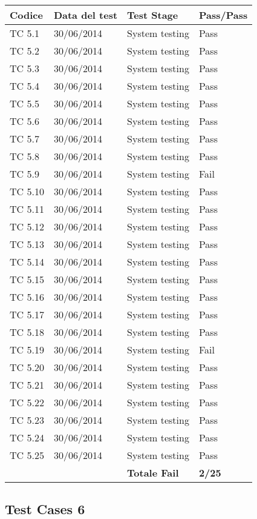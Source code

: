 \begin{tabular}{|p{3cm}|p{3cm}|p{3cm}|p{3cm}|}
	\hline
	\rowcolor{Gray}
	\textbf{Codice} & \textbf{Data del test} & \textbf{Test Stage} & \textbf{Pass/Pass}\tabularnewline
	\hline
	TC 5.1			& 30/06/2014 			& System testing		& Pass \tabularnewline
	\hline
	TC 5.2			& 30/06/2014 			& System testing		& Pass \tabularnewline
	\hline
	TC 5.3			& 30/06/2014 			& System testing		& Pass \tabularnewline
	\hline
	TC 5.4			& 30/06/2014 			& System testing		& Pass \tabularnewline
	\hline
	TC 5.5			& 30/06/2014 			& System testing		& Pass \tabularnewline
	\hline
	TC 5.6			& 30/06/2014 			& System testing		& Pass \tabularnewline
	\hline
	TC 5.7			& 30/06/2014 			& System testing		& Pass \tabularnewline
	\hline
	TC 5.8			& 30/06/2014 			& System testing		& Pass \tabularnewline
	\hline
	TC 5.9			& 30/06/2014 			& System testing		& Fail \tabularnewline
	\hline
	TC 5.10			& 30/06/2014 			& System testing		& Pass \tabularnewline
	\hline
	TC 5.11			& 30/06/2014 			& System testing		& Pass \tabularnewline
	\hline
	TC 5.12			& 30/06/2014 			& System testing		& Pass \tabularnewline
	\hline
	TC 5.13			& 30/06/2014 			& System testing		& Pass \tabularnewline
	\hline
	TC 5.14			& 30/06/2014 			& System testing		& Pass \tabularnewline
	\hline
	TC 5.15			& 30/06/2014 			& System testing		& Pass \tabularnewline
	\hline
	TC 5.16			& 30/06/2014 			& System testing		& Pass \tabularnewline
	\hline
	TC 5.17			& 30/06/2014 			& System testing		& Pass \tabularnewline
	\hline
	TC 5.18			& 30/06/2014 			& System testing		& Pass \tabularnewline
	\hline
	TC 5.19			& 30/06/2014 			& System testing		& Fail \tabularnewline
	\hline
	TC 5.20			& 30/06/2014 			& System testing		& Pass \tabularnewline
	\hline
	TC 5.21			& 30/06/2014 			& System testing		& Pass \tabularnewline
	\hline
	TC 5.22			& 30/06/2014 			& System testing		& Pass \tabularnewline
	\hline
	TC 5.23			& 30/06/2014 			& System testing		& Pass \tabularnewline
	\hline
	TC 5.24			& 30/06/2014 			& System testing		& Pass \tabularnewline
	\hline
	TC 5.25			& 30/06/2014 			& System testing		& Pass \tabularnewline
	\hline
					& 						& \textbf{Totale Fail}	& \textbf{2/25} \tabularnewline
	\hline
\end{tabular}

\subsection{Test Cases 6}

